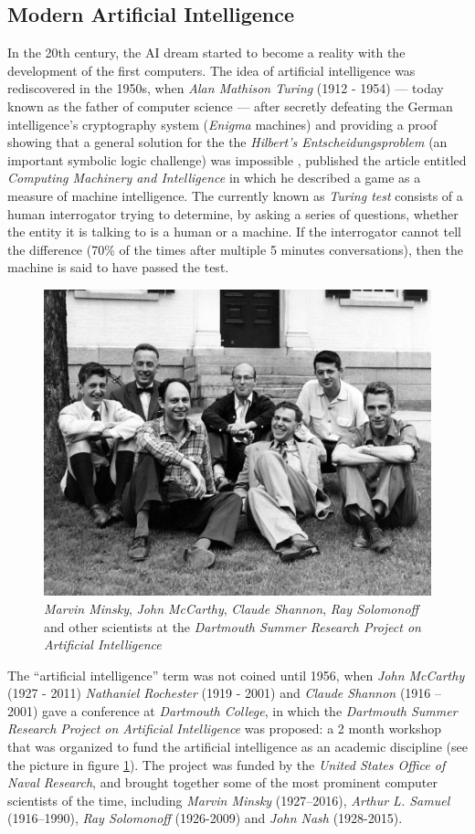 \subsection{Modern Artificial Intelligence}
In the 20th century, the AI dream started to become a reality with the development of the first computers. The idea of artificial intelligence was rediscovered in the 1950s, when \textit{Alan Mathison Turing} (1912 - 1954) — today known as the father of computer science — after secretly defeating the German intelligence's cryptography system (\textit{Enigma} machines) \autocite{Hodges:2000} and providing a proof showing that a general solution for the the \textit{Hilbert's Entscheidungsproblem} (an important symbolic logic challenge) was impossible \autocite{turing1936}, published the article entitled \textit{Computing Machinery and Intelligence} \autocite{turing1950} in which he described a game as a measure of machine intelligence. The currently known as \textit{Turing test} consists of a human interrogator trying to determine, by asking a series of questions, whether the entity it is talking to is a human or a machine. If the interrogator cannot tell the difference (70\% of the times after multiple 5 minutes conversations), then the machine is said to have passed the test.

\begin{figure}
	\centering
	\includegraphics[width=.6\textwidth]{chapter1/images/dartmouth}
	\caption{\textit{Marvin Minsky}, \textit{John McCarthy}, \textit{Claude Shannon}, \textit{Ray Solomonoff} and other scientists at the \textit{Dartmouth Summer Research Project on Artificial Intelligence}}
	\label{fig:dartmouth_photo}
\end{figure}

The ``artificial intelligence'' term was not coined until 1956, when \textit{John McCarthy} (1927 - 2011) \textit{Nathaniel Rochester} (1919 - 2001) and \textit{Claude Shannon} (1916 – 2001) gave a conference at \textit{Dartmouth College}, in which the \textit{Dartmouth Summer Research Project on Artificial Intelligence} was proposed: a 2 month workshop that was organized to fund the artificial intelligence as an academic discipline (see the picture in figure \ref{fig:dartmouth_photo}). The project was funded by the \textit{United States Office of Naval Research}, and brought together some of the most prominent computer scientists of the time, including \textit{Marvin Minsky} (1927–2016), \textit{Arthur L. Samuel} (1916–1990), \textit{Ray Solomonoff} (1926-2009) and \textit{John Nash} (1928-2015).

